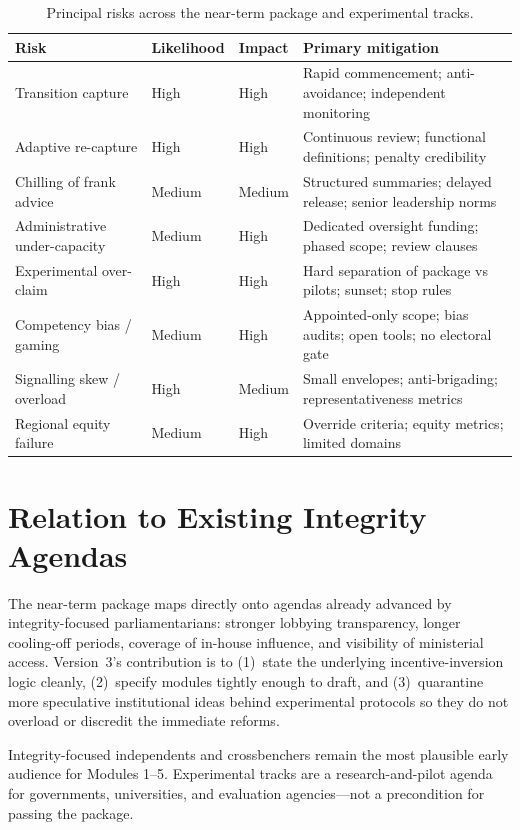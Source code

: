 \documentclass[11pt,a4paper]{article}
\begin{document}
\begin{table}[H]
\centering
\small
\begin{tabular}{@{}p{3.1cm}p{1.8cm}p{1.8cm}p{5.8cm}@{}}
\toprule
\textbf{Risk} & \textbf{Likelihood} & \textbf{Impact} & \textbf{Primary mitigation} \\
\midrule
Transition capture & High & High & Rapid commencement; anti-avoidance; independent monitoring \\
Adaptive re-capture & High & High & Continuous review; functional definitions; penalty credibility \\
Chilling of frank advice & Medium & Medium & Structured summaries; delayed release; senior leadership norms \\
Administrative under-capacity & Medium & High & Dedicated oversight funding; phased scope; review clauses \\
Experimental over-claim & High & High & Hard separation of package vs pilots; sunset; stop rules \\
Competency bias / gaming & Medium & High & Appointed-only scope; bias audits; open tools; no electoral gate \\
Signalling skew / overload & High & Medium & Small envelopes; anti-brigading; representativeness metrics \\
Regional equity failure & Medium & High & Override criteria; equity metrics; limited domains \\
\bottomrule
\end{tabular}
\caption{Principal risks across the near-term package and experimental tracks.}
\label{tab:risks}
\end{table}

\section{Relation to Existing Integrity Agendas}

The near-term package maps directly onto agendas already advanced by integrity-focused parliamentarians: stronger lobbying transparency, longer cooling-off periods, coverage of in-house influence, and visibility of ministerial access. Version~3’s contribution is to (1)~state the underlying incentive-inversion logic cleanly, (2)~specify modules tightly enough to draft, and (3)~quarantine more speculative institutional ideas behind experimental protocols so they do not overload or discredit the immediate reforms.

Integrity-focused independents and crossbenchers remain the most plausible early audience for Modules 1--5. Experimental tracks are a research-and-pilot agenda for governments, universities, and evaluation agencies---not a precondition for passing the package.
\end{document}
